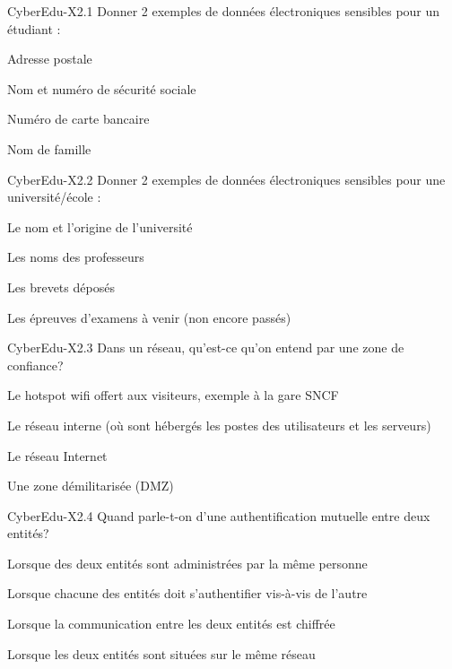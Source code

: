 

\begin{multi}[multiple=true]{CyberEdu-X2.1}
	Donner 2 exemples de données électroniques sensibles pour un étudiant :
\item Adresse postale
\item* Nom et numéro de sécurité sociale
\item* Numéro de carte bancaire
\item Nom de famille
\end{multi}

\begin{multi}[multiple=true]{CyberEdu-X2.2}
	Donner 2 exemples de données électroniques sensibles pour une université/école :
\item Le nom et l'origine de l'université
\item Les noms des professeurs
\item* Les brevets déposés
\item* Les épreuves d'examens à venir (non encore passés)
\end{multi}

\begin{multi}[multiple=true]{CyberEdu-X2.3}
	Dans un réseau, qu'est-ce qu'on entend par une zone de confiance?
\item Le hotspot wifi offert aux visiteurs, exemple à la gare SNCF
\item* Le réseau interne (où sont hébergés les postes des utilisateurs et les serveurs)
\item Le réseau Internet
\item Une zone démilitarisée (DMZ)
\end{multi}

\begin{multi}[multiple=true]{CyberEdu-X2.4}
	Quand parle-t-on d'une authentification mutuelle entre deux entités?
\item Lorsque des deux entités sont administrées par la même personne
\item* Lorsque chacune des entités doit s'authentifier vis-à-vis de l'autre
\item Lorsque la communication entre les deux entités est chiffrée
\item Lorsque les deux entités sont situées sur le même réseau
\end{multi}

